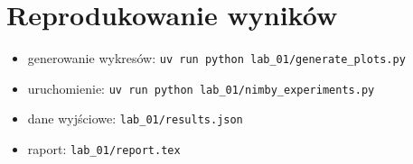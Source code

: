 \documentclass[11pt,a4paper]{article}
\begin{document}
\section{Reprodukowanie wyników}
\begin{itemize}
    \item generowanie wykresów: \texttt{uv run python lab\_01/generate\_plots.py}
    \item uruchomienie: \texttt{uv run python lab\_01/nimby\_experiments.py}
    \item dane wyjściowe: \texttt{lab\_01/results.json}
    \item raport: \texttt{lab\_01/report.tex}
\end{itemize}
\end{document}
